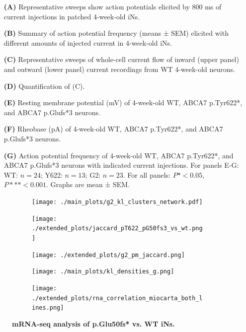\documentclass[12pt]{article}
\begin{document}
\begin{itemize}
    \item[\textbf{(A)}] Representative sweeps show action potentials elicited by 800 ms of current injections in patched 4-week-old iNs.
    \item[\textbf{(B)}] Summary of action potential frequency (means ± SEM) elicited with different amounts of injected current in 4-week-old iNs. 
    \item[\textbf{(C)}] Representative sweeps of whole-cell current flow of inward (upper panel) and outward (lower panel) current recordings from WT 4-week-old neurons. 
    \item[\textbf{(D)}] Quantification of (C). 
    \item[\textbf{(E)}] Resting membrane potential (mV) of 4-week-old WT, ABCA7 p.Tyr622*, and ABCA7 p.Glufs*3 neurons. 
    \item[\textbf{(F)}] Rheobase (pA) of 4-week-old WT, ABCA7 p.Tyr622*, and ABCA7 p.Glufs*3 neurons. 
    \item[\textbf{(G)}] Action potential frequency of 4-week-old WT, ABCA7 p.Tyr622*, and ABCA7 p.Glufs*3 neurons with indicated current injections. For panels E-G: WT: $n=24$; Y622: $n=13$; G2: $n=23$. For all panels: $P*<0.05$, $P***<0.001$. Graphs are mean ± SEM.
\end{itemize} \clearpage
\begin{figure}[H]
    \begin{subfigure}[t]{.3\textwidth}
        \caption{}
        \texttt{[image: ./main\_plots/g2\_kl\_clusters\_network.pdf]}        
    \end{subfigure}
    \begin{subfigure}[t]{.3\textwidth}
        \caption{}
        \texttt{[image: ./extended\_plots/jaccard\_pT622\_pG50fs3\_vs\_wt.png]}        
    \end{subfigure}
    \begin{subfigure}[t]{.3\textwidth}
        \caption{}
        \texttt{[image: ./extended\_plots/g2\_pm\_jaccard.png]}        
    \end{subfigure}
    \begin{subfigure}[t]{.6\textwidth}
        \caption{}
        \texttt{[image: ./main\_plots/kl\_densities\_g.png]}        
    \end{subfigure}
    \hspace{0.5cm}
    \begin{subfigure}[t]{.3\textwidth}
        \caption{}
        \texttt{[image: ./extended\_plots/rna\_correlation\_miocarta\_both\_lines.png]}        
    \end{subfigure}
    \caption{
        \textbf{mRNA-seq analysis of p.Glu50fs* vs. WT iNs.}\\
    }
    \label{fig:bulk_RNAseq_supplement}
\end{figure}
\end{document}

